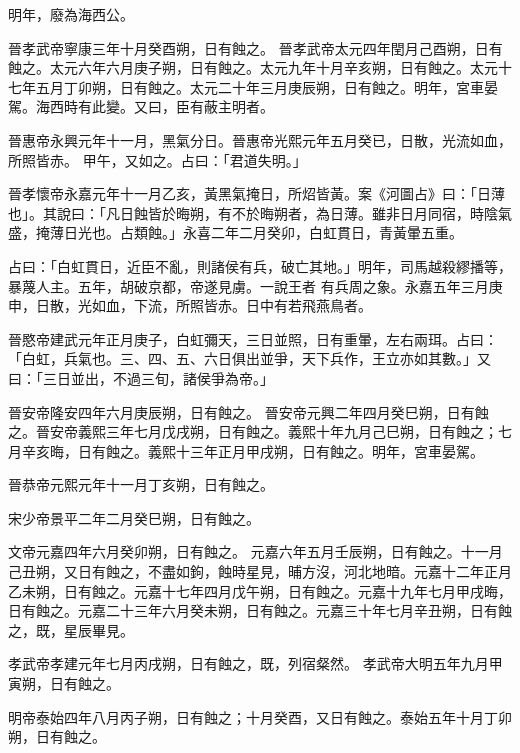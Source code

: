 \begin{pinyinscope}
 明年，廢為海西公。



 晉孝武帝寧康三年十月癸酉朔，日有蝕之。
 晉孝武帝太元四年閏月己酉朔，日有蝕之。太元六年六月庚子朔，日有蝕之。太元九年十月辛亥朔，日有蝕之。太元十七年五月丁卯朔，日有蝕之。太元二十年三月庚辰朔，日有蝕之。明年，宮車晏駕。海西時有此變。又曰，臣有蔽主明者。



 晉惠帝永興元年十一月，黑氣分日。晉惠帝光熙元年五月癸已，日散，光流如血，所照皆赤。
 甲午，又如之。占曰：「君道失明。」



 晉孝懷帝永嘉元年十一月乙亥，黃黑氣掩日，所炤皆黃。案《河圖占》曰：「日薄也」。其說曰：「凡日蝕皆於晦朔，有不於晦朔者，為日薄。雖非日月同宿，時陰氣盛，掩薄日光也。占類蝕。」永喜二年二月癸卯，白虹貫日，青黃暈五重。



 占曰：「白虹貫日，近臣不亂，則諸侯有兵，破亡其地。」明年，司馬越殺繆播等，暴蔑人主。五年，胡破京都，帝遂見虜。一說王者
 有兵周之象。永嘉五年三月庚申，日散，光如血，下流，所照皆赤。日中有若飛燕鳥者。



 晉愍帝建武元年正月庚子，白虹彌天，三日並照，日有重暈，左右兩珥。占曰：「白虹，兵氣也。三、四、五、六日俱出並爭，天下兵作，王立亦如其數。」又曰：「三日並出，不過三旬，諸侯爭為帝。」



 晉安帝隆安四年六月庚辰朔，日有蝕之。
 晉安帝元興二年四月癸巳朔，日有蝕之。晉安帝義熙三年七月戊戌朔，日有蝕之。義熙十年九月己巳朔，日有蝕之；七月辛亥晦，日有蝕之。義熙十三年正月甲戌朔，日有蝕之。明年，宮車晏駕。



 晉恭帝元熙元年十一月丁亥朔，日有蝕之。



 宋少帝景平二年二月癸巳朔，日有蝕之。



 文帝元嘉四年六月癸卯朔，日有蝕之。
 元嘉六年五月壬辰朔，日有蝕之。十一月己丑朔，又日有蝕之，不盡如鉤，蝕時星見，晡方沒，河北地暗。元嘉十二年正月乙未朔，日有蝕之。元嘉十七年四月戊午朔，日有蝕之。元嘉十九年七月甲戌晦，日有蝕之。元嘉二十三年六月癸未朔，日有蝕之。元嘉三十年七月辛丑朔，日有蝕之，既，星辰畢見。



 孝武帝孝建元年七月丙戌朔，日有蝕之，既，列宿粲然。
 孝武帝大明五年九月甲寅朔，日有蝕之。



 明帝泰始四年八月丙子朔，日有蝕之；十月癸酉，又日有蝕之。泰始五年十月丁卯朔，日有蝕之。




\end{pinyinscope}

